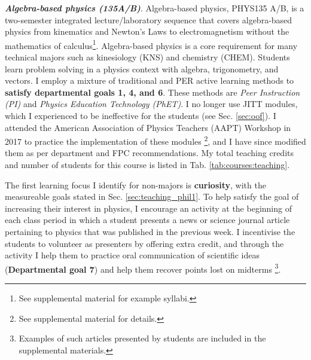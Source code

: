 \documentclass[../../../main.tex]{subfiles}
\begin{document}
\textbf{\textit{Algebra-based physics (135A/B)}}. Algebra-based physics, PHYS135 A/B, is a two-semester integrated lecture/laboratory sequence that covers algebra-based physics from kinematics and Newton's Laws to electromagnetism without the mathematics of calculus\footnote{See supplemental material for example syllabi.}.  Algebra-based physics is a core requirement for many technical majors such as kinesiology (KNS) and chemistry (CHEM).  Students learn problem solving in a physics context with algebra, trigonometry, and vectors.  I employ a mixture of traditional and PER active learning methods to \textbf{satisfy departmental goals 1, 4, and 6}.  These methods are \textit{Peer Instruction (PI)} and \textit{Physics Education Technology (PhET)}.  I no longer use JITT modules, which I experienced to be ineffective for the students (see Sec. \ref{sec:oof}).  I attended the American Association of Physics Teachers (AAPT) Workshop in 2017 to practice the implementation of these modules \footnote{See supplemental material for details.}, and I have since modified them as per department and FPC recommendations.  My total teaching credits and number of students for this course is listed in Tab. \ref{tab:courses:teaching}.  \\ \hspace{0.1cm}

The first learning focus I identify for non-majors is \textbf{curiosity}, with the measureable goals stated in Sec. \ref{sec:teaching_phil1}.  To help satisfy the goal of increasing their interest in physics, I encourage an activity at the beginning of each class period in which a student presents a news or science journal article pertaining to physics that was published in the previous week.  I incentivise the students to volunteer as presenters by offering extra credit, and through the activity I help them to practice oral communication of scientific ideas (\textbf{Departmental goal 7}) and help them recover points lost on midterms \footnote{Examples of such articles presented by students are included in the supplemental materials.}. \\ \hspace{0.1cm}
\end{document}
